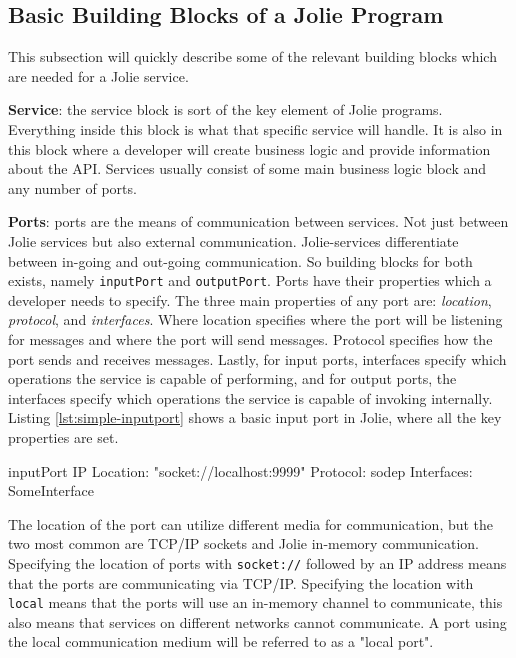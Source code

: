 \subsection{Basic Building Blocks of a Jolie Program}
This subsection will quickly describe some of the relevant building blocks which are needed for a Jolie service.

\textbf{Service}: the service block is sort of the key element of Jolie programs. Everything inside this block is what that specific service will handle. It is also 
in this block where a developer will create business logic and provide information about the API. Services usually consist of some main business logic block and any number of ports.

\textbf{Ports}: ports are the means of communication between services. Not just between Jolie services but also external communication.
Jolie-services differentiate between in-going and out-going communication. So building blocks for both exists, namely \texttt{inputPort} and \texttt{outputPort}.
Ports have their properties which a developer needs to specify. The three main properties of any port are: \textit{location}, \textit{protocol}, and \textit{interfaces}.
Where location specifies where the port will be listening for messages and where the port will send messages.
Protocol specifies how the port sends and receives messages. Lastly, for input ports, interfaces specify which
operations the service is capable of performing, and for output ports, the interfaces specify which
operations the service is capable of invoking internally. Listing \ref*{lst:simple-inputport} shows a basic input port in Jolie, where all the key properties are set.

\begin{jolisting}[][caption={Simple input port in Jolie},label=lst:simple-inputport]
inputPort IP {
    Location: "socket://localhost:9999"
    Protocol: sodep
    Interfaces: SomeInterface
}
\end{jolisting}

The location of the port can utilize different media for communication, but the two most common are TCP/IP sockets and Jolie in-memory communication.
Specifying the location of ports with \texttt{socket://} followed by an IP address means that the ports are communicating via TCP/IP.
Specifying the location with \texttt{local} means that the ports will use an in-memory channel to communicate, this also means that services on different networks cannot communicate.
A port using the local communication medium will be referred to as a "local port".


